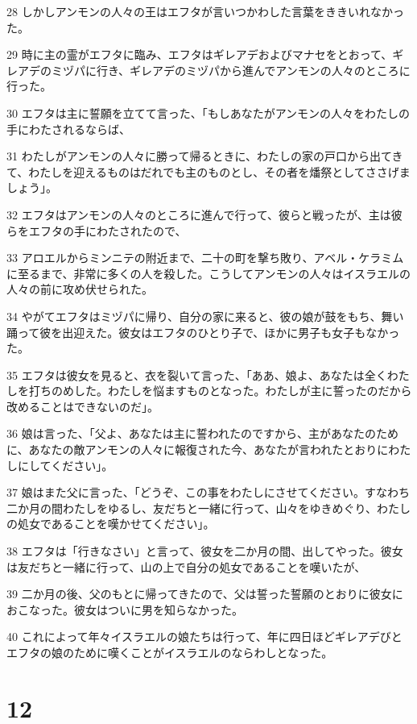 \par 28 しかしアンモンの人々の王はエフタが言いつかわした言葉をききいれなかった。
\par 29 時に主の霊がエフタに臨み、エフタはギレアデおよびマナセをとおって、ギレアデのミヅパに行き、ギレアデのミヅパから進んでアンモンの人々のところに行った。
\par 30 エフタは主に誓願を立てて言った、「もしあなたがアンモンの人々をわたしの手にわたされるならば、
\par 31 わたしがアンモンの人々に勝って帰るときに、わたしの家の戸口から出てきて、わたしを迎えるものはだれでも主のものとし、その者を燔祭としてささげましょう」。
\par 32 エフタはアンモンの人々のところに進んで行って、彼らと戦ったが、主は彼らをエフタの手にわたされたので、
\par 33 アロエルからミンニテの附近まで、二十の町を撃ち敗り、アベル・ケラミムに至るまで、非常に多くの人を殺した。こうしてアンモンの人々はイスラエルの人々の前に攻め伏せられた。
\par 34 やがてエフタはミヅパに帰り、自分の家に来ると、彼の娘が鼓をもち、舞い踊って彼を出迎えた。彼女はエフタのひとり子で、ほかに男子も女子もなかった。
\par 35 エフタは彼女を見ると、衣を裂いて言った、「ああ、娘よ、あなたは全くわたしを打ちのめした。わたしを悩ますものとなった。わたしが主に誓ったのだから改めることはできないのだ」。
\par 36 娘は言った、「父よ、あなたは主に誓われたのですから、主があなたのために、あなたの敵アンモンの人々に報復された今、あなたが言われたとおりにわたしにしてください」。
\par 37 娘はまた父に言った、「どうぞ、この事をわたしにさせてください。すなわち二か月の間わたしをゆるし、友だちと一緒に行って、山々をゆきめぐり、わたしの処女であることを嘆かせてください」。
\par 38 エフタは「行きなさい」と言って、彼女を二か月の間、出してやった。彼女は友だちと一緒に行って、山の上で自分の処女であることを嘆いたが、
\par 39 二か月の後、父のもとに帰ってきたので、父は誓った誓願のとおりに彼女におこなった。彼女はついに男を知らなかった。
\par 40 これによって年々イスラエルの娘たちは行って、年に四日ほどギレアデびとエフタの娘のために嘆くことがイスラエルのならわしとなった。

\chapter{12}

